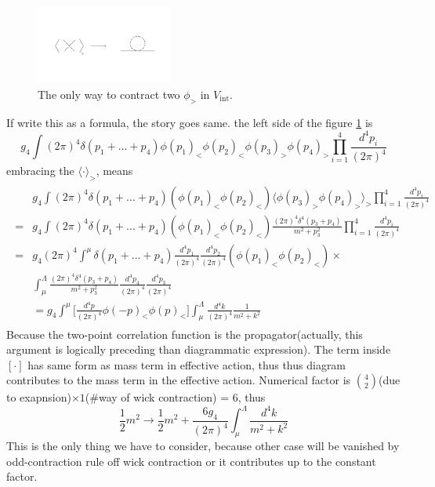 \documentclass[12pt,halfline,a4paper]{ouparticle}
\begin{document}
\begin{figure}
	\centering
	\includegraphics[width=0.4\textwidth]{Fig3.jpeg}
	\caption{The only way to contract two $\phi_>$ in $V_\text{int}$.}
	\label{fig:Vdouble}
\end{figure}
If write this as a formula, the story goes same. the left side of the figure \ref{fig:Vdouble} is
\begin{equation}
		g_4\int(2\pi)^4\delta(p_1+...+p_4)\phi(p_1)_<\phi(p_2)_<\phi(p_3)_>\phi(p_4)_>\prod_{i=1}^4\frac{d^4p_i}{(2\pi)^4}
\end{equation}
embracing the $\langle \cdot \rangle_>$, means
\begin{align}
\begin{split}
\label{eq:massshiftcalc}
	&g_4\int(2\pi)^4\delta(p_1+...+p_4)(\phi(p_1)_<\phi(p_2)_<)\langle\phi(p_3)_>\phi(p_4)_>\rangle_>\prod_{i=1}^4\frac{d^4p_i}{(2\pi)^4}\\
=&g_4\int(2\pi)^4\delta(p_1+...+p_4)(\phi(p_1)_<\phi(p_2)_<)\frac{(2\pi)^4\delta^4(p_3+p_4)}{m^2+p_3^2}\prod_{i=1}^4\frac{d^4p_i}{(2\pi)^4}\\
=&g_4(2\pi)^4\int^\mu\delta(p_1+...+p_4)\frac{d^4p_1}{(2\pi)^4}\frac{d^4p_2}{(2\pi)^4}(\phi(p_1)_<\phi(p_2)_<)\times\\
&\int_\mu^\Lambda\frac{(2\pi)^4\delta^4(p_3+p_4)}{m^2+p_3^2}\frac{d^4p_4}{(2\pi)^4}\frac{d^4p_3}{(2\pi)^4}\\
&=g_4\int^\mu\bigg[\frac{d^4p}{(2\pi)^4}\phi(-p)_<\phi(p)_<\bigg]\int^\Lambda_\mu\frac{d^4k}{(2\pi)^4}\frac{1}{m^2+k^2}	
\end{split}
\end{align}
Because the two-point correlation function is the propagator(actually, this argument is logically preceding than diagrammatic expression). The term inside $[\cdot]$ has same form as mass term in effective action, thus thus diagram contributes to the mass term in the effective action.
Numerical factor is ${4\choose 2}$(due to exapnsion)$\times 1$($\#$way of wick contraction) = 6, thus
\begin{equation}
	\frac{1}{2}m^2\rightarrow\frac{1}{2} m^2+\frac{6g_4}{(2\pi)^4}\int^\Lambda_\mu\frac{d^4k}{m^2+k^2}
\end{equation}
This is the only thing we have to consider, because other case will be vanished by odd-contraction rule off wick contraction or it contributes up to the constant factor.
\end{document}
